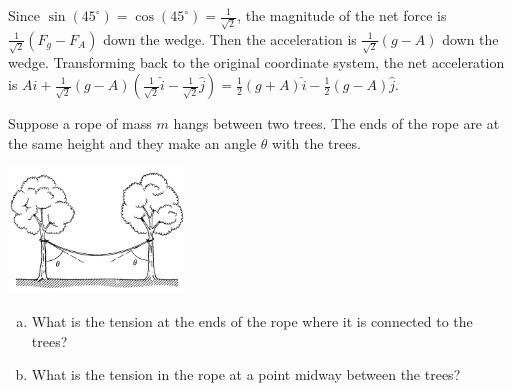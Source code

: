 \documentclass{esg8012pset}
\begin{document}
\begin{solution}
  Since $\sin(45^{\circ}) = \cos(45^{\circ}) = \frac{1}{\sqrt{2}}$, the magnitude of the net force is $\frac{1}{\sqrt{2}}(F_g - F_A)$ down the wedge.  Then the acceleration is $\frac{1}{\sqrt{2}}(g - A)$ down the wedge.  Transforming back to the original coordinate system, the net acceleration is $A \hat i + \frac{1}{\sqrt{2}}(g - A)\left(\frac{1}{\sqrt{2}}\hat i - \frac{1}{\sqrt{2}} \hat j\right) = \frac{1}{2}(g + A) \hat i - \frac{1}{2}(g - A)\hat j$.

\end{solution}


\begin{problem}[Problem 2.22]
  Suppose a rope of mass $m$ hangs between two trees. The ends of the rope are at the same height and they make an angle $\theta$ with the trees.
  \begin{center}\includegraphics[width=0.35\textwidth]{ps02_5}\end{center}
  \begin{enumerate}[a)]
    \item What is the tension at the ends of the rope where it is connected to the trees?
    \item What is the tension in the rope at a point midway between the trees?
  \end{enumerate}
\end{problem}
\end{document}
